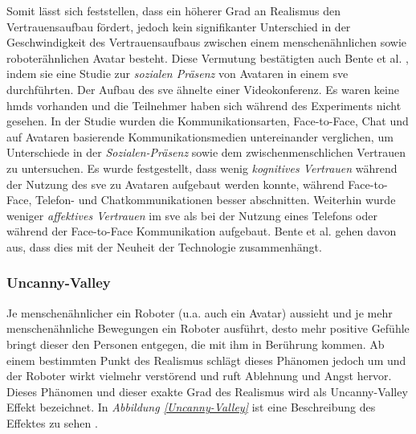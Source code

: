 \documentclass[a4paper,11pt]{article}%
\renewcommand{\\}{\vspace*{0.5\baselineskip} \newline}
\begin{document}
Somit lässt sich feststellen, dass ein höherer Grad an Realismus den Vertrauensaufbau fördert, jedoch kein signifikanter Unterschied in der Geschwindigkeit  des Vertrauensaufbaus zwischen einem menschenähnlichen sowie roboterähnlichen Avatar besteht. Diese Vermutung bestätigten auch Bente et al. \citep[S. 54-59]{bente2004social}, indem sie eine Studie zur \textit{sozialen Präsenz} von Avataren in einem \ac{sve} durchführten. Der Aufbau des \ac{sve} ähnelte einer Videokonferenz. Es waren keine \ac{hmd}s vorhanden und die Teilnehmer haben sich während des Experiments nicht gesehen. In der Studie wurden die Kommunikationsarten, Face-to-Face, Chat und auf Avataren basierende Kommunikationsmedien untereinander verglichen, um Unterschiede in der \textit{Sozialen-Präsenz} sowie dem zwischenmenschlichen Vertrauen zu untersuchen.
Es wurde festgestellt, dass wenig \textit{kognitives Vertrauen} während der Nutzung des \ac{sve} zu Avataren aufgebaut werden konnte, während Face-to-Face, Telefon- und Chatkommunikationen besser abschnitten. Weiterhin wurde weniger \textit{affektives Vertrauen} im \ac{sve} als bei der Nutzung eines Telefons oder während der Face-to-Face Kommunikation aufgebaut.
Bente et al. \citep[S. 54-59]{bente2004social} gehen davon aus, dass dies mit der Neuheit der Technologie zusammenhängt.

\subsubsection{Uncanny-Valley}
\label{Uncanny-Valley-Effekt}
Je menschenähnlicher ein Roboter (u.a. auch ein Avatar) aussieht und je mehr menschenähnliche Bewegungen ein Roboter ausführt, desto mehr positive Gefühle bringt dieser den Personen entgegen, die mit ihm in Berührung kommen. Ab einem bestimmten Punkt des Realismus schlägt dieses Phänomen jedoch um und der Roboter wirkt vielmehr verstörend und ruft  Ablehnung und Angst hervor. Dieses Phänomen und dieser exakte Grad des Realismus wird als Uncanny-Valley Effekt bezeichnet. In \textit{Abbildung \ref{Uncanny-Valley}} ist eine Beschreibung des Effektes zu sehen \citep[S. 352-353]{gast2011unheimliche}.
\end{document}
